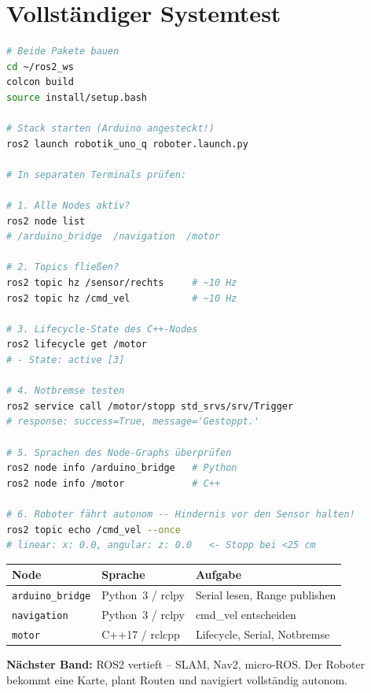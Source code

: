 \section{Vollständiger Systemtest}

\begin{loesungBox}
\begin{lstlisting}[language=bash]
# Beide Pakete bauen
cd ~/ros2_ws
colcon build
source install/setup.bash

# Stack starten (Arduino angesteckt!)
ros2 launch robotik_uno_q roboter.launch.py

# In separaten Terminals prüfen:

# 1. Alle Nodes aktiv?
ros2 node list
# /arduino_bridge  /navigation  /motor

# 2. Topics fließen?
ros2 topic hz /sensor/rechts     # ~10 Hz
ros2 topic hz /cmd_vel           # ~10 Hz

# 3. Lifecycle-State des C++-Nodes
ros2 lifecycle get /motor
# - State: active [3]

# 4. Notbremse testen
ros2 service call /motor/stopp std_srvs/srv/Trigger
# response: success=True, message='Gestoppt.'

# 5. Sprachen des Node-Graphs überprüfen
ros2 node info /arduino_bridge   # Python
ros2 node info /motor            # C++

# 6. Roboter fährt autonom -- Hindernis vor den Sensor halten!
ros2 topic echo /cmd_vel --once
# linear: x: 0.0, angular: z: 0.0   <- Stopp bei <25 cm
\end{lstlisting}
\end{loesungBox}

\begin{projektBox}
\begin{tabular}{lll}
\hline
\textbf{Node} & \textbf{Sprache} & \textbf{Aufgabe} \\
\hline
\texttt{arduino\_bridge} & Python~3 / rclpy & Serial lesen, Range publishen \\
\texttt{navigation}      & Python~3 / rclpy & cmd\_vel entscheiden \\
\texttt{motor}           & C++17 / rclcpp  & Lifecycle, Serial, Notbremse \\
\hline
\end{tabular}

\bigskip
\textbf{Nächster Band:} ROS2 vertieft -- SLAM, Nav2, micro-ROS.
Der Roboter bekommt eine Karte, plant Routen
und navigiert vollständig autonom.
\end{projektBox}

